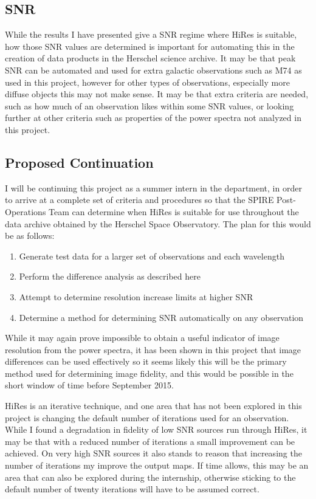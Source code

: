 \subsection{SNR}

While the results I have presented give a SNR regime where HiRes is suitable, how those SNR values are determined is important for automating this in the creation of data products in the Herschel science archive. It may be that peak SNR can be automated and used for extra galactic observations such as M74 as used in this project, however for other types of observations, especially more diffuse objects this may not make sense. It may be that extra criteria are needed, such as how much of an observation likes within some SNR values, or looking further at other criteria such as properties of the power spectra not analyzed in this project.

\subsection{Proposed Continuation}

I will be continuing this project as a summer intern in the department, in order to arrive at a complete set of criteria and procedures so that the SPIRE Post-Operations Team can determine when HiRes is suitable for use throughout the data archive obtained by the Herschel Space Observatory. The plan for this would be as follows:
\begin{enumerate}
    \item{Generate test data for a larger set of observations and each wavelength}
    \item{Perform the difference analysis as described here}
    \item{Attempt to determine resolution increase limits at higher SNR}
    \item{Determine a method for determining SNR automatically on any observation}
\end{enumerate}

While it may again prove impossible to obtain a useful indicator of image resolution from the power spectra, it has been shown in this project that image differences can be used effectively so it seems likely this will be the primary method used for determining image fidelity, and this would be possible in the short window of time before September 2015.

HiRes is an iterative technique, and one area that has not been explored in this project is changing the default number of iterations used for an observation. While I found a degradation in fidelity of low SNR sources run through HiRes, it may be that with a reduced number of iterations a small improvement can be achieved. On very high SNR sources it also stands to reason that increasing the number of iterations my improve the output maps. If time allows, this may be an area that can also be explored during the internship, otherwise sticking to the default number of twenty iterations will have to be assumed correct.
